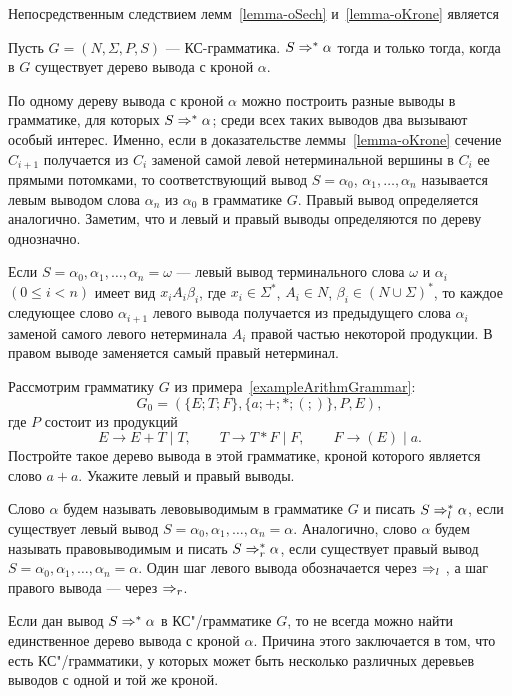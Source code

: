 Непосредственным следствием лемм~\ref{lemma-oSech} и~\ref{lemma-oKrone} является

\begin{mytheorem}
\label{theorem-SechKrona}
Пусть $G=(N,\Sigma,P,S)$ --- КС-грамматика. $S\Rightarrow^*\alpha$ тогда и только тогда, когда в $G$ существует дерево вывода с кроной $\alpha$.
\end{mytheorem}

По одному дереву вывода с кроной $\alpha$ можно построить разные выводы в грамматике, для которых $S\Rightarrow^*\alpha$; среди всех таких выводов два вызывают особый интерес. Именно, если в доказательстве леммы~\ref{lemma-oKrone} сечение $C_{i+1}$ получается из $C_i$ заменой самой левой нетерминальной вершины в $C_i$ ее прямыми потомками, то соответствующий вывод $S=\alpha_0$, $\alpha_1, \ldots , \alpha_n$ называется левым выводом слова $\alpha_n$ из $\alpha_0$ в грамматике $G$. Правый вывод определяется аналогично. Заметим, что и левый и правый выводы определяются по дереву однозначно.

Если $S=\alpha_0,\alpha_1, \ldots , \alpha_n=\omega$ --- левый вывод терминального слова $\omega$ и $\alpha_i$ $(0\le i<n)$ имеет вид $x_iA_i\beta_i$, где $x_i\in\Sigma^*$, $A_i\in N$, $\beta_i\in(N\cup\Sigma)^*$, то каждое следующее слово $\alpha_{i+1}$ левого вывода получается из предыдущего слова $\alpha_i$ заменой самого левого нетерминала $A_i$ правой частью некоторой продукции. В правом выводе заменяется самый правый нетерминал.

\begin{myproblem}
Рассмотрим грамматику $G$ из примера~\ref{exampleArithmGrammar}:
\[G_0=(\{E;T;F\}, \{a;+;*;(;)\},P,E),\]
где $P$ состоит из продукций
\[
    E \to E+T \mid T, \qquad
    T \to T*F \mid F, \qquad
    F \to (E) \mid a.
\]
Постройте такое дерево вывода в этой грамматике, кроной которого является слово $a+a$. Укажите левый и правый выводы.
\end{myproblem}

Слово $\alpha$ будем называть левовыводимым в грамматике $G$ и писать $S\Rightarrow_l^*\alpha$, если существует левый вывод $S=\alpha_0,\alpha_1, \ldots , \alpha_n=\alpha$. Аналогично, слово $\alpha$ будем называть правовыводимым и писать $S\Rightarrow_r^*\alpha$, если существует правый вывод $S=\alpha_0,\alpha_1, \ldots , \alpha_n=\alpha$. Один шаг левого вывода обозначается через $\Rightarrow_l$ , а шаг правого вывода --- через $\Rightarrow_r$.

Если дан вывод $S\Rightarrow^*\alpha$ в КС"/грамматике $G$, то не всегда можно найти единственное дерево вывода с кроной $\alpha$. Причина этого заключается в том, что есть КС"/грамматики, у которых может быть несколько различных деревьев выводов с одной и той же кроной.

